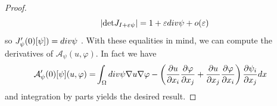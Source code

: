 \documentclass[10pt,a4paper]{amsart}
\def\div{\textup{div}}
\begin{document}
\begin{proof}
\begin{equation}
    \label{derjacobiano}
|\mathrm{det}J_{I+\varepsilon \psi}|=1+\varepsilon \div\psi +o(\varepsilon)
\end{equation}
so $J_\psi'(0)[\psi])=\div\psi$ . With these equalities in mind, we can compute the derivatives of $\mathcal{A}_\psi(u,\varphi)$. In fact we have
\begin{eqnarray*}
    \mathcal{A}'_\psi(0)[\psi](u,\varphi)=&\int_\Omega\div\psi \nabla u\nabla \varphi - \left(\frac{\partial u}{\partial x_i}\frac{\partial \varphi}{\partial x_j}+
\frac{\partial u}{\partial x_j}\frac{\partial \varphi}{\partial x_i}
\right)\frac{\partial \psi_i}{ \partial x_j}dx
\end{eqnarray*} 
and integration by parts yields the desired result.
\end{proof}
\end{document}
